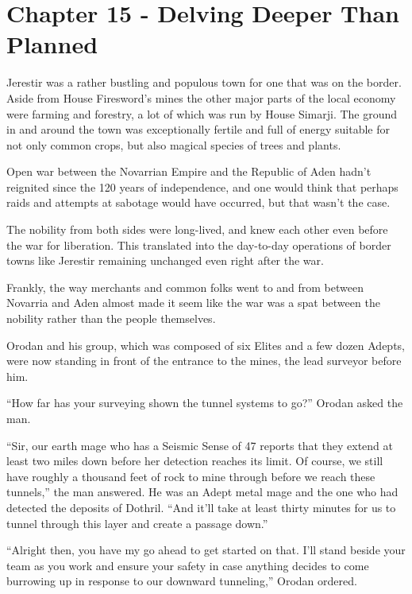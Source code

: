 \documentclass[a4paper,10pt]{book}
\begin{document}
\section*{Chapter 15 - Delving Deeper Than Planned}
%
\par
Jerestir was a rather bustling and populous town for one that was on the border. Aside from House Firesword’s mines the other major parts of the local economy were farming and forestry, a lot of which was run by House Simarji. The ground in and around the town was exceptionally fertile and full of energy suitable for not only common crops, but also magical species of trees and plants.\par
Open war between the Novarrian Empire and the Republic of Aden hadn’t reignited since the 120 years of independence, and one would think that perhaps raids and attempts at sabotage would have occurred, but that wasn’t the case.\par
The nobility from both sides were long-lived, and knew each other even before the war for liberation. This translated into the day-to-day operations of border towns like Jerestir remaining unchanged even right after the war.\par
Frankly, the way merchants and common folks went to and from between Novarria and Aden almost made it seem like the war was a spat between the nobility rather than the people themselves.\par
Orodan and his group, which was composed of six Elites and a few dozen Adepts, were now standing in front of the entrance to the mines, the lead surveyor before him.\par
“How far has your surveying shown the tunnel systems to go?” Orodan asked the man.\par
“Sir, our earth mage who has a Seismic Sense of 47 reports that they extend at least two miles down before her detection reaches its limit. Of course, we still have roughly a thousand feet of rock to mine through before we reach these tunnels,” the man answered. He was an Adept metal mage and the one who had detected the deposits of Dothril. “And it’ll take at least thirty minutes for us to tunnel through this layer and create a passage down.”\par
“Alright then, you have my go ahead to get started on that. I’ll stand beside your team as you work and ensure your safety in case anything decides to come burrowing up in response to our downward tunneling,” Orodan ordered.\par
\end{document}
